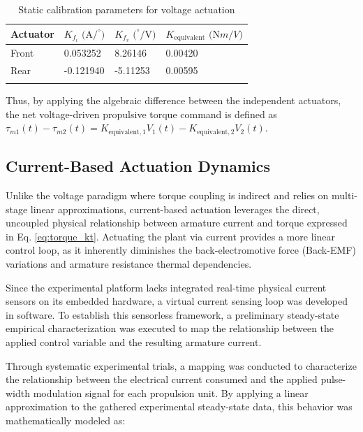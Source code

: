 \documentclass[pdflatex,sn-mathphys-num,iicol]{sn-jnl}
\theoremstyle{thmstyleone}%
\theoremstyle{thmstyletwo}%
\theoremstyle{thmstylethree}%
\begin{document}
\begin{table}[h]
\caption{Static calibration parameters for voltage actuation}\label{tab1}%
\begin{center}
\begin{minipage}{\columnwidth}
\footnotesize %
\begin{tabular*}{\columnwidth}{@{\extracolsep{\fill}}@{}llll@{}}
\toprule
Actuator & $K_{f_i} \text{ (A/}^\circ\text{)}$ & $K_{f_v} \text{ (}^\circ\text{/V)}$ & $K_{\text{equivalent}} \text{ (N}{m/V)}$ \\
\midrule
Front & 0.053252 & 8.26146 & 0.00420 \\
Rear  & -0.121940 & -5.11253 & 0.00595 \\
\botrule
\end{tabular*}
\end{minipage}
\end{center}
\label{tab:voltage_parameters}
\end{table}
Thus, by applying the algebraic difference between the independent actuators, the net voltage-driven propulsive torque command is defined as $\tau_{m1}(t) - \tau_{m2}(t) = K_{\text{equivalent},1}V_1(t) - K_{\text{equivalent},2}V_2(t)$.

\subsection{Current-Based Actuation Dynamics}
\label{sub:current_actuation}

Unlike the voltage paradigm where torque coupling is indirect and relies on multi-stage linear approximations, current-based actuation leverages the direct, uncoupled physical relationship between armature current and torque expressed in Eq. \eqref{eq:torque_kt}. Actuating the plant via current provides a more linear control loop, as it inherently diminishes the back-electromotive force (Back-EMF) variations and armature resistance thermal dependencies.

Since the experimental platform lacks integrated real-time physical current sensors on its embedded hardware, a virtual current sensing loop was developed in software. To establish this sensorless framework, a preliminary steady-state empirical characterization was executed to map the relationship between the applied control variable and the resulting armature current. 

Through systematic experimental trials, a mapping was conducted to characterize the relationship between the electrical current consumed and the applied pulse-width modulation signal for each propulsion unit. By applying a linear approximation to the gathered experimental steady-state data, this behavior was mathematically modeled as:
\end{document}
